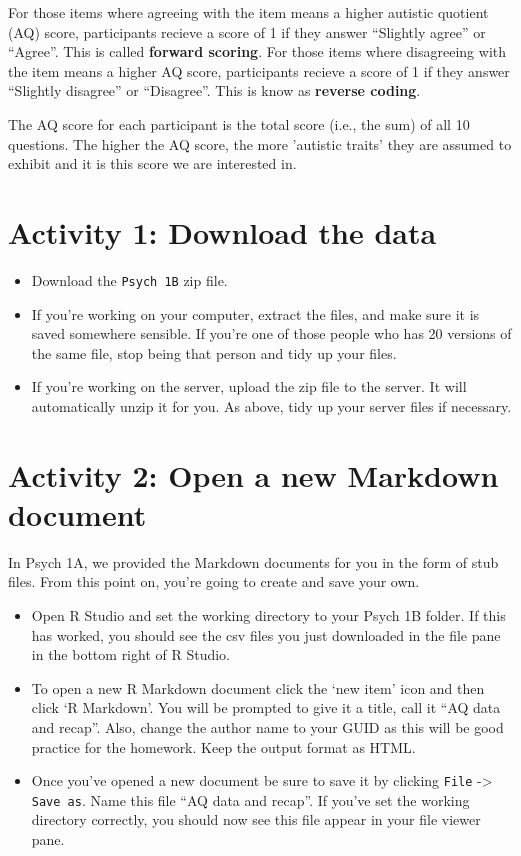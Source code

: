 \documentclass[
  oneside]{book}
\providecommand{\tightlist}{%
  \setlength{\itemsep}{0pt}\setlength{\parskip}{0pt}}
\begin{document}
For those items where agreeing with the item means a higher autistic quotient (AQ) score, participants recieve a score of 1 if they answer ``Slightly agree'' or ``Agree''. This is called \textbf{forward scoring}. For those items where disagreeing with the item means a higher AQ score, participants recieve a score of 1 if they answer ``Slightly disagree'' or ``Disagree''. This is know as \textbf{reverse coding}.

The AQ score for each participant is the total score (i.e., the sum) of all 10 questions. The higher the AQ score, the more 'autistic traits' they are assumed to exhibit and it is this score we are interested in.

\hypertarget{activity-1-download-the-data}{%
\section{Activity 1: Download the data}\label{activity-1-download-the-data}}

\begin{itemize}
\tightlist
\item
  Download the \texttt{Psych\ 1B} zip file.
\item
  If you're working on your computer, extract the files, and make sure it is saved somewhere sensible. If you're one of those people who has 20 versions of the same file, stop being that person and tidy up your files.
\item
  If you're working on the server, upload the zip file to the server. It will automatically unzip it for you. As above, tidy up your server files if necessary.
\end{itemize}

\hypertarget{activity-2-open-a-new-markdown-document}{%
\section{Activity 2: Open a new Markdown document}\label{activity-2-open-a-new-markdown-document}}

In Psych 1A, we provided the Markdown documents for you in the form of stub files. From this point on, you're going to create and save your own.

\begin{itemize}
\tightlist
\item
  Open R Studio and set the working directory to your Psych 1B folder. If this has worked, you should see the csv files you just downloaded in the file pane in the bottom right of R Studio.\\
\item
  To open a new R Markdown document click the `new item' icon and then click `R Markdown'. You will be prompted to give it a title, call it ``AQ data and recap''. Also, change the author name to your GUID as this will be good practice for the homework. Keep the output format as HTML.
\item
  Once you've opened a new document be sure to save it by clicking \texttt{File} -\textgreater{} \texttt{Save\ as}. Name this file ``AQ data and recap''. If you've set the working directory correctly, you should now see this file appear in your file viewer pane.
\end{itemize}
\end{document}
